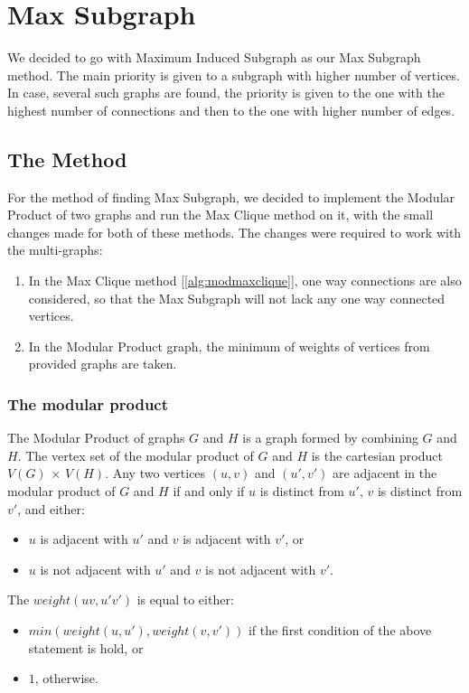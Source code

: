 \section{Max Subgraph}
We decided to go with Maximum Induced Subgraph as our Max Subgraph method. The main priority is given to a subgraph with higher number of vertices. In case, several such graphs are found, the priority is given to the one with the highest number of connections and then to the one with higher number of edges.

\subsection{The Method}
For the method of finding Max Subgraph, we decided to implement the Modular Product of two graphs and run the Max Clique method on it, with the small changes made for both of these methods. The changes were required to work with the multi-graphs:
\begin{enumerate}
    \item In the Max Clique method [\ref{alg:modmaxclique}], one way connections are also considered, so that the Max Subgraph will not lack any one way connected vertices.
    \item In the Modular Product graph, the minimum of weights of vertices from provided graphs are taken.
\end{enumerate}

\subsubsection{The modular product}
The Modular  Product of graphs $G$ and $H$ is a graph formed by combining $G$ and $H$. The vertex set of the modular product of $G$ and $H$ is the cartesian product {$V(G)$} × {$V(H)$}. Any two vertices {$(u, v)$} and {$(u' , v' )$} are adjacent in the modular product of $G$ and $H$ if and only if $u$ is distinct from $u'$, $v$ is distinct from $v'$, and either:
\begin{itemize}
    \item $u$ is adjacent with $u'$ and $v$ is adjacent with $v'$, or
    \item $u$ is not adjacent with $u'$ and $v$ is not adjacent with $v'$.
\end{itemize}
The ${weight(uv, u'v')}$ is equal to either:
\begin{itemize}
    \item ${min(weight(u, u'), weight(v, v'))}$ if the first condition of the above statement is hold, or
    \item $1$, otherwise.
\end{itemize}


